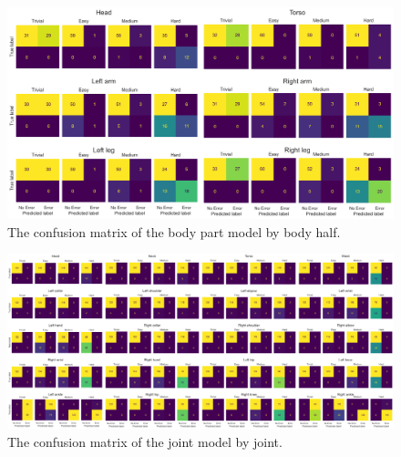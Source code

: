 \begin{figure}[htbp]
  \centering
  \includegraphics[width=\textwidth]{figures/Results/v1/confusion/body_parts_difficulty.png}
  \caption[Body Part Model Confusion Matrix by Body Half]{The confusion matrix of the body part model by body half.}
  \label{fig:conf_v1_bp}
\end{figure}

\begin{figure}[htbp]
  \centering
  \includegraphics[width=\textwidth]{figures/Results/v1/confusion/joints_difficulty.png}
  \caption[Joint Model Confusion Matrix by Joint]{The confusion matrix of the joint model by joint.}
  \label{fig:conf_v1_bp}
\end{figure}